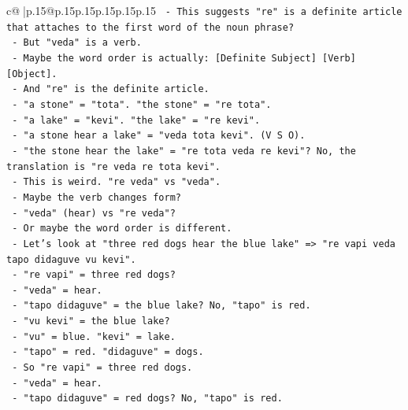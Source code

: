 \documentclass{article}
\begin{document}
{\begin{supertabular}{c@{$\;$}|p{.15\linewidth}@{}p{.15\linewidth}p{.15\linewidth}p{.15\linewidth}p{.15\linewidth}p{.15\linewidth}}
{{{\texttt{                     {-} This suggests "re" is a definite article that attaches to the first word of the noun phrase?} \\
\texttt{                     {-} But "veda" is a verb.} \\
\texttt{                     {-} Maybe the word order is actually: {[}Definite Subject{]} {[}Verb{]} {[}Object{]}.} \\
\texttt{                     {-} And "re" is the definite article.} \\
\texttt{                     {-} "a stone" = "tota". "the stone" = "re tota".} \\
\texttt{                     {-} "a lake" = "kevi". "the lake" = "re kevi".} \\
\texttt{                     {-} "a stone hear a lake" = "veda tota kevi". (V S O).} \\
\texttt{                     {-} "the stone hear the lake" = "re tota veda re kevi"? No, the translation is "re veda re tota kevi".} \\
\texttt{                     {-} This is weird. "re veda" vs "veda".} \\
\texttt{                     {-} Maybe the verb changes form?} \\
\texttt{                     {-} "veda" (hear) vs "re veda"?} \\
\texttt{                     {-} Or maybe the word order is different.} \\
\texttt{                     {-} Let's look at "three red dogs hear the blue lake" => "re vapi veda tapo didaguve vu kevi".} \\
\texttt{                       {-} "re vapi" = three red dogs?} \\
\texttt{                       {-} "veda" = hear.} \\
\texttt{                       {-} "tapo didaguve" = the blue lake? No, "tapo" is red.} \\
\texttt{                       {-} "vu kevi" = the blue lake?} \\
\texttt{                       {-} "vu" = blue. "kevi" = lake.} \\
\texttt{                       {-} "tapo" = red. "didaguve" = dogs.} \\
\texttt{                       {-} So "re vapi" = three red dogs.} \\
\texttt{                       {-} "veda" = hear.} \\
\texttt{                       {-} "tapo didaguve" = red dogs? No, "tapo" is red.} \\
}}}
\end{supertabular}}
\end{document}
